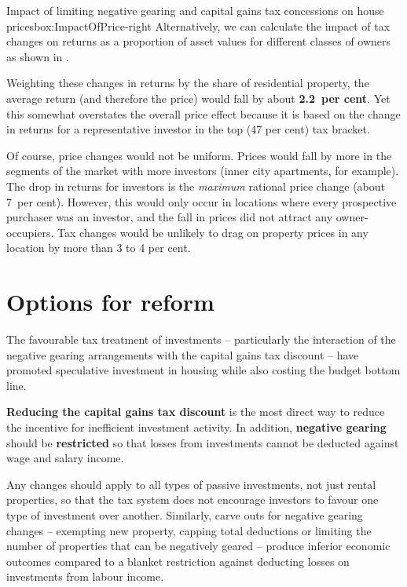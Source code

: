 {\begin{rultrabox}{Impact of limiting negative gearing and capital gains \newline tax concessions on house prices}{box:ImpactOfPrice-right}
Alternatively, we can calculate the impact of tax changes on returns as a proportion of asset values for different classes of owners as shown in
.

Weighting these changes in returns by the share of residential property, the average return (and therefore the price) would fall by about \textbf{2.2~per cent}. Yet this somewhat overstates the overall price effect because it is based on the change in returns for a representative investor in the top (47 per cent) tax bracket.

Of course, price changes would not be uniform. Prices would fall by more in the segments of the market with more investors (inner city apartments, for example). The drop in returns for investors is the \emph{maximum} rational price change (about 7~per cent). However, this would only occur in locations where every prospective purchaser was an investor, and the fall in prices did not attract any owner-occupiers. Tax changes would be unlikely to drag on property prices in any location by more than 3 to 4 per cent.

\end{rultrabox}%
}


\chapter{Options for reform}\label{chapter:options-for-reform}
The favourable tax treatment of investments -- particularly the interaction of the negative gearing arrangements with the capital gains tax discount -- have promoted speculative investment in housing while also costing the budget bottom line. 

\textbf{Reducing the capital gains tax discount} is the most direct way to reduce the incentive for inefficient investment activity. 
In addition, \textbf{negative gearing} should be \textbf{restricted} so that losses from investments cannot be deducted against wage and salary income. 

Any changes should apply to all types of passive investments, not just rental properties, so that the tax system does not encourage investors to favour one type of investment over another. 
Similarly, carve outs for negative gearing changes – exempting new property, capping total deductions or limiting the number of properties that can be negatively geared – produce inferior economic outcomes compared to a blanket restriction against deducting losses on investments from labour income.

